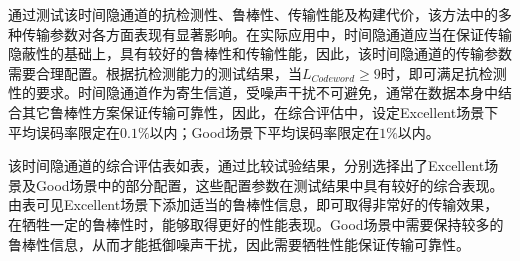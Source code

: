 通过测试该时间隐通道的抗检测性、鲁棒性、传输性能及构建代价，该方法中的多种传输参数对各方面表现有显著影响。在实际应用中，时间隐通道应当在保证传输隐蔽性的基础上，具有较好的鲁棒性和传输性能，因此，该时间隐通道的传输参数需要合理配置。根据抗检测能力的测试结果，当$L_{Codeword}\ge 9$时，即可满足抗检测性的要求。时间隐通道作为寄生信道，受噪声干扰不可避免，通常在数据本身中结合其它鲁棒性方案保证传输可靠性，因此，在综合评估中，设定Excellent场景下平均误码率限定在$0.1\%$以内；Good场景下平均误码率限定在$1\%$以内。


该时间隐通道的综合评估表如表，通过比较试验结果，分别选择出了Excellent场景及Good场景中的部分配置，这些配置参数在测试结果中具有较好的综合表现。由表可见Excellent场景下添加适当的鲁棒性信息，即可取得非常好的传输效果，在牺牲一定的鲁棒性时，能够取得更好的性能表现。Good场景中需要保持较多的鲁棒性信息，从而才能抵御噪声干扰，因此需要牺牲性能保证传输可靠性。

